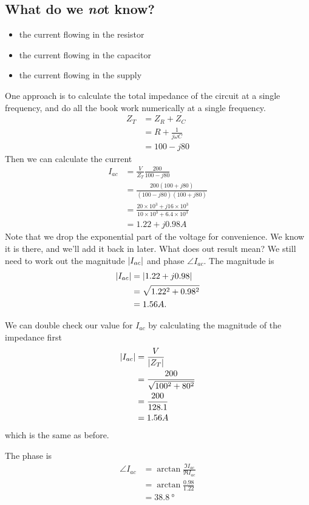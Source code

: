 \documentclass{tufte-handout}
\newcommand{\iac}{I_{ac}}%
\begin{document}
\subsection{What do we \emph{no}t know?}
\begin{itemize}
\item the current flowing in the resistor
\item the current flowing in the capacitor
\item the current flowing in the supply
\end{itemize}

One approach is to calculate the total impedance of the circuit at a single frequency, and do all the book work numerically at a single frequency.
\begin{align}
Z_T &= Z_R + Z_C \\ 
& = R + \frac{1}{j\omega C} \\
& = 100 - j80
\end{align}
Then we can calculate the current 
\begin{align}
\iac &= \frac{V}{Z_T}
 \frac{200}{100-j80}\\
&= \frac{200(100+j80)}{(100-j80)(100+j80)}\\
& = \frac{20\times10^3+j16\times10^3}{10\times10^3 + 6.4\times10^3} \\
& = 1.22 + j0.98 A
\end{align}
Note that we drop the exponential part of the voltage for convenience. We know it is there, and we'll add it back in later.
What does out result mean? We still need to work out the magnitude $\abs{\iac}$ and phase $\angle{\iac}$. The magnitude is
\begin{align}
\abs{\iac} &= \abs{1.22 + j0.98} \\
&= \sqrt{1.22^2 + 0.98^2} \\
&= 1.56 A.
\end{align}

We can double check our value for $\iac$ by calculating the magnitude of the impedance first
\begin{align}
\abs{\iac} &= \frac{V}{\abs{Z_T}} \\
&= \frac{200}{\sqrt{100^2 + 80^2}} \\
& = \frac{200}{128.1} \\
& = 1.56A
\end{align}
which is the same as before.

The phase is
\begin{align}
\angle{\iac} &= \arctan{\frac{\Im{\iac}}{\Re{\iac}}} \\
&= \arctan{\frac{0.98}{1.22}}  \\
&= \SI{38.8}{\degree}
\end{align}
\end{document}
